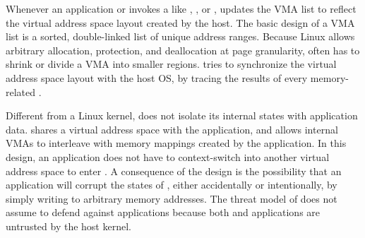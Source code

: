Whenever an application or \glibc{} invokes a \linuxapi{} like , , or , \thelibos{} updates the VMA list
to reflect the virtual address space layout created by the host.
The basic design of a VMA list is a sorted, double-linked list of unique address ranges.
Because Linux allows arbitrary allocation, protection, and deallocation at page granularity, \thelibos{} often has to shrink or divide a VMA
into smaller regions.
\thelibos{} tries to synchronize
the virtual address space layout with the host OS, by tracing the results of every memory-related \hostapis{}.







Different from a Linux kernel, \thelibos{} does not isolate its internal states with application data.
\thelibos{} shares a virtual address space with the application,
and allows internal VMAs to interleave with memory mappings created by the application.
In this design, an application does not have to context-switch into another virtual address space to enter \thelibos{}.
A consequence of the design is the possibility that an application will corrupt the states of \thelibos{}, either accidentally or intentionally, by simply writing to arbitrary memory addresses.
The threat model of \graphene{} does not assume
\thelibos{} to defend against applications because both \thelibos{} and applications are untrusted by the host kernel. 





